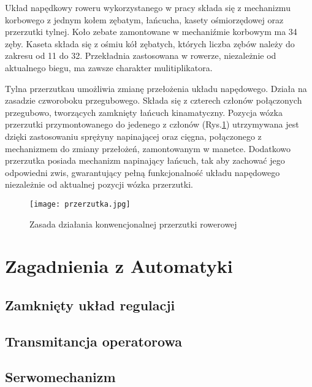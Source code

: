 Układ napędkowy roweru wykorzystanego w pracy składa się z mechanizmu korbowego z jednym kołem zębatym, łańcucha, kasety ośmiorzędowej oraz przerzutki tylnej. Koło zebate zamontowane w mechaniźmie korbowym ma 34 zęby. Kaseta składa się z ośmiu kół zębatych, których liczba zębów należy do zakresu od 11 do 32. Przekładnia zastosowana w rowerze, niezależnie od aktualnego biegu, ma zawsze charakter mulitiplikatora.

Tylna przerzutkau umożliwia zmianę przełożenia układu napędowego. Działa na zasadzie czworoboku przegubowego. Składa się z czterech członów połączonych przegubowo, tworzących zamknięty łańcuch kinamatyczny. Pozycja wózka przerzutki przymontowanego do jedenego z członów (Rys.\ref{fig:przerzutka}) utrzymywana jest dzięki zastosowaniu sprężyny napinającej oraz cięgna, połączonego z mechanizmem do zmiany przełożeń, zamontowanym w manetce. Dodatkowo przerzutka posiada mechanizm napinający łańcuch, tak aby zachować jego odpowiedni zwis, gwarantujący pełną funkcjonalność układu napędowego niezależnie od aktualnej pozycji wózka przerzutki. 
\begin{figure}[h]
    \centering
    \texttt{[image: przerzutka.jpg]}
    \caption{Zasada działania konwencjonalnej przerzutki rowerowej}
    \label{fig:przerzutka}
\end{figure}

\section{Zagadnienia z Automatyki}
\subsection{Zamknięty układ regulacji}
\subsection{Transmitancja operatorowa}

\subsection{Serwomechanizm}
